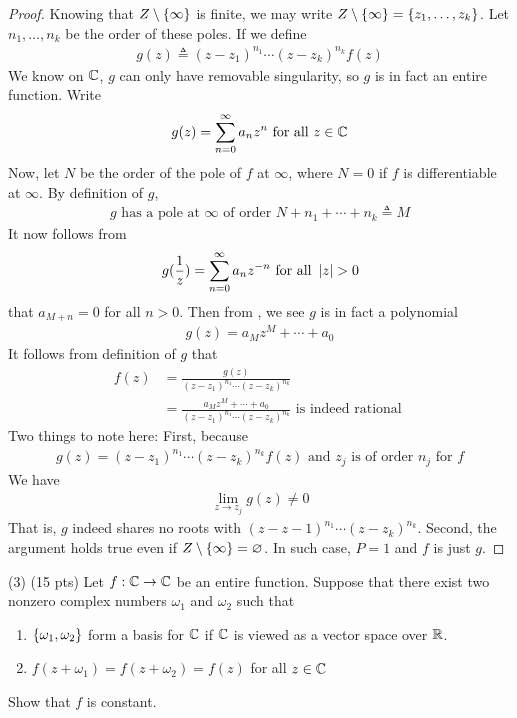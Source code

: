 \documentclass{report}
\begin{document}
\begin{proof}
Knowing that $Z\setminus \{ \infty \}$ is finite, we may write $Z \setminus \{ \infty \}=\{ z_1,\dots ,z_k \}$. Let $n_1,\dots ,n_k$ be the order of these poles. If we define  
\begin{align*}
g(z)\triangleq  (z-z_1)^{n_1} \cdots (z-z_k)^{n_k} f(z)
\end{align*}
We know on $\mathbb{C}$,  $g$ can only have removable singularity, so $g$ is in fact an entire function. Write 
\begin{align}
\label{gz}
g(z)= \sum_{n=0}^{\infty}a_nz^n\text{ for all }z\in\mathbb{C}
\end{align}
Now, let $N$ be the order of the pole of  $f$ at  $\infty$, where $N=0$ if  $f$ is differentiable at $\infty$. By definition of $g$, 
 \begin{align*}
g\text{ has a pole at $\infty$ of order }N+n_1+\cdots +n_k\triangleq M
\end{align*}
It now follows from 
\begin{align*}
g(\frac{1}{z})= \sum_{n=0}^{\infty} a_nz^{-n}\text{ for all }\abso{z}>0
\end{align*}
that $a_{M+n}=0$ for all $n>0$. Then from  , we see $g$ is in fact a polynomial 
\begin{align*}
g(z)=a_Mz^M+ \cdots + a_0
\end{align*}
It follows from definition of $g$ that
\begin{align*}
f(z)&= \frac{g(z)}{(z-z_1)^{n_1}\cdots (z-z_k)^{n_k}}\\
&= \frac{a_Mz^M + \cdots +a_0}{(z-z_1)^{n_1}\cdots (z-z_k)^{n_k}}\text{ is indeed rational }
\end{align*}
Two things to note here: First, because 
\begin{align*}
  g(z)= (z-z_1)^{n_1}\cdots (z-z_k)^{n_k}f(z)\text{ and }z_j\text{ is of order $n_j$ for }f
\end{align*}
We have 
\begin{align*}
\lim_{z\to z_j} g(z)\neq 0
\end{align*}
That is,  $g$ indeed shares no roots with $(z-z-1)^{n_1}\cdots (z-z_k)^{n_k}$. Second, the argument holds true even if $Z\setminus \{ \infty \}=\varnothing$. In such case, $P=1$ and $f$ is just  $g$.  
\end{proof}
\begin{question}{}{}
  (3) (15 pts) Let $f:\mathbb{C}\rightarrow \mathbb{C}$ be an entire function. Suppose that there exist two nonzero complex numbers $\omega_1$ and $\omega_2$ such that 
  \begin{enumerate}[label=(\alph*)]
    \item $\{ \omega_1,\omega_2 \}$ form a basis for $\mathbb{C}$ if $\mathbb{C}$ is viewed as a vector space over  $\mathbb{R}$.  
    \item $f(z+\omega_1)=f(z+\omega_2)=f(z)$ for all $z\in\mathbb{C}$ 
  \end{enumerate}
Show that $f$ is constant. 
\end{question}
\end{document}
